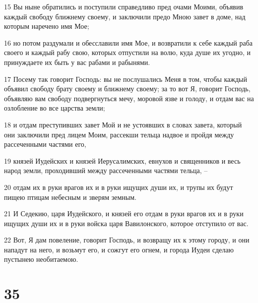 \par 15 Вы ныне обратились и поступили справедливо пред очами Моими, объявив каждый свободу ближнему своему, и заключили предо Мною завет в доме, над которым наречено имя Мое;
\par 16 но потом раздумали и обесславили имя Мое, и возвратили к себе каждый раба своего и каждый рабу свою, которых отпустили на волю, куда душе их угодно, и принуждаете их быть у вас рабами и рабынями.
\par 17 Посему так говорит Господь: вы не послушались Меня в том, чтобы каждый объявил свободу брату своему и ближнему своему; за то вот Я, говорит Господь, объявляю вам свободу подвергнуться мечу, моровой язве и голоду, и отдам вас на озлобление во все царства земли;
\par 18 и отдам преступивших завет Мой и не устоявших в словах завета, который они заключили пред лицем Моим, рассекши тельца надвое и пройдя между рассеченными частями его,
\par 19 князей Иудейских и князей Иерусалимских, евнухов и священников и весь народ земли, проходивший между рассеченными частями тельца, --
\par 20 отдам их в руки врагов их и в руки ищущих души их, и трупы их будут пищею птицам небесным и зверям земным.
\par 21 И Седекию, царя Иудейского, и князей его отдам в руки врагов их и в руки ищущих души их и в руки войска царя Вавилонского, которое отступило от вас.
\par 22 Вот, Я дам повеление, говорит Господь, и возвращу их к этому городу, и они нападут на него, и возьмут его, и сожгут его огнем, и города Иудеи сделаю пустынею необитаемою.

\chapter{35}

